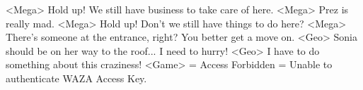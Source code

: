 <Mega> Hold up! We still have business to take care of here. 
<Mega> Prez is really mad. 
<Mega> Hold up! Don't we still have things to do here? 
<Mega> There's someone at the entrance, right? You better get a move on. 
<Geo> Sonia should be on her way to the roof... I need to hurry! 
<Geo> I have to do something about this craziness! 
<Game> = Access Forbidden = Unable to authenticate WAZA Access Key. 
